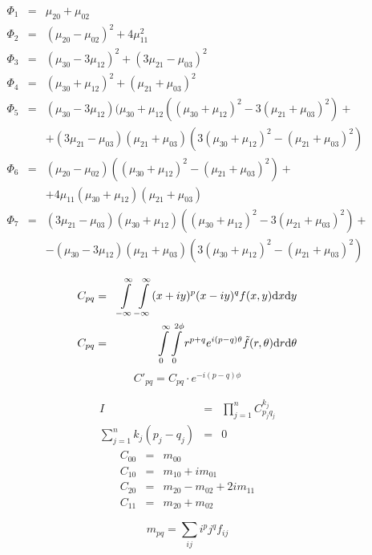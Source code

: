\begin{eqnarray}
\Phi_1&=&\mu_{20}+\mu_{02}\\
\Phi_2&=&(\mu_{20}-\mu_{02})^2+4\mu^2_{11}\\
\Phi_3&=&(\mu_{30}-3\mu_{12})^2+(3\mu_{21}-\mu_{03})^2\\
\Phi_4&=&(\mu_{30}+\mu_{12})^2+(\mu_{21}+\mu_{03})^2\\
\Phi_5&=&(\mu_{30}-3\mu_{12})(\mu_{30}+\mu_{12}((\mu_{30}+\mu_{12})^2-3(\mu_{21}+\mu_{03})^2)+\nonumber\\
&&+(3\mu_{21}-\mu_{03})(\mu_{21}+\mu_{03})(3(\mu_{30}+\mu_{12})^2-(\mu_{21}+\mu_{03})^2)\\
\Phi_6&=&(\mu_{20}-\mu_{02})((\mu_{30}+\mu_{12})^2-(\mu_{21}+\mu_{03})^2)+\nonumber\\
&&+4\mu_{11}(\mu_{30}+\mu_{12})(\mu_{21}+\mu_{03})\\
\Phi_7&=&(3\mu_{21}-\mu_{03})(\mu_{30}+\mu_{12})((\mu_{30}+\mu_{12})^2-3(\mu_{21}+\mu_{03})^2)+\nonumber\\
&&-(\mu_{30}-3\mu_{12})(\mu_{21}+\mu_{03})(3(\mu_{30}+\mu_{12})^2-(\mu_{21}+\mu_{03})^2)
\end{eqnarray}

\begin{eqnarray}
C_{pq}&=&\int\limits_{-\infty}^\infty\int\limits_{-\infty}^\infty(x+iy)^p(x-iy)^q f(x,y){\rm d} x{\rm d} y\\
C_{pq}&=&\int\limits_0^\infty\int\limits_0^{2\phi}r^{p+q}e^{i(p-q)\theta}\tilde{f}(r,\theta){\rm d} r{\rm d} \theta
\end{eqnarray}
\begin{equation}
{C'}_{pq}=C_{pq}\cdot e^{-i(p-q)\phi}
\end{equation}

\begin{eqnarray}
I&=&\prod\limits_{j=1}^nC_{p_jq_j}^{k_j}\\
\sum\limits_{j=1}^nk_j(p_j-q_j)&=&0
\end{eqnarray}
\begin{eqnarray}
C_{00}&=&m_{00}\\
C_{10}&=&m_{10}+im_{01}\\
C_{20}&=&m_{20}-m_{02}+2im_{11}\\
C_{11}&=&m_{20}+m_{02}
\end{eqnarray}

\begin{equation}
m_{pq}=\sum\limits_{ij}i^pj^qf_{ij}
\end{equation}

